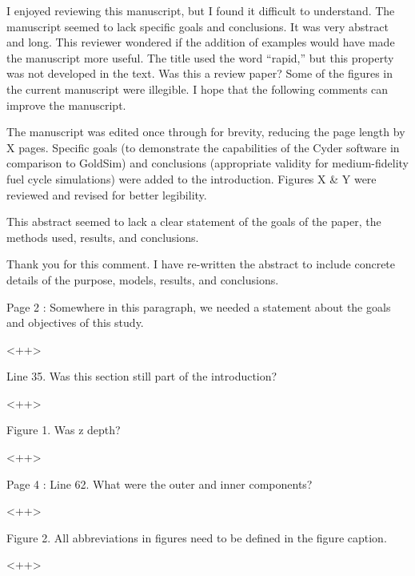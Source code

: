\documentclass[answers,12pt]{exam}
\begin{document}
\begin{questions}
\question I enjoyed reviewing this manuscript, but I found it difficult to understand.
The manuscript seemed to lack specific goals and conclusions. It was very
abstract and long.  This reviewer wondered if the addition of examples would
have made the manuscript more useful. The title used the word “rapid,” but this
property was not developed in the text. Was this a review paper? Some of the
figures in the current manuscript were illegible. I hope that the following
comments can improve the manuscript.
\begin{solution}
The manuscript was edited once through for brevity, reducing the page length by
X pages. Specific goals (to demonstrate the capabilities of the Cyder software
in comparison to GoldSim) and conclusions (appropriate validity for
medium-fidelity fuel cycle simulations) were added to the introduction. Figures
X \& Y were reviewed and revised for better legibility.
\end{solution}

\question This abstract seemed to lack a clear statement of the goals of the paper, the methods used, results, and conclusions.
\begin{solution}
Thank you for this comment. I have re-written the abstract to include concrete 
details of the purpose, models, results, and conclusions. 
\end{solution}

\question Page 2 : Somewhere in this paragraph, we needed a statement about the goals and objectives of this study.
\begin{solution}
<++>
\end{solution}


\question Line 35. Was this section still part of the introduction?

\begin{solution}
<++>
\end{solution}

\question Figure 1. Was z depth?
\begin{solution}
<++>
\end{solution}

\question Page 4 : Line 62. What were the outer and inner components?

\begin{solution}
<++>
\end{solution}
 

\question Figure 2. All abbreviations in figures need to be defined in the figure caption.
\begin{solution}
<++>
\end{solution}
 


\end{questions}
\end{document}

